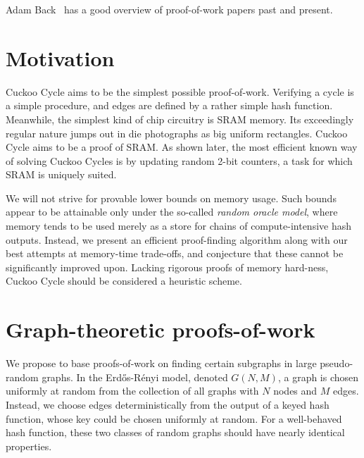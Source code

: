 \documentclass[11pt, oneside]{article}
\begin{document}
Adam Back~\cite{back2014} has a good overview of proof-of-work papers past and present.

\section{Motivation}
Cuckoo Cycle aims to be the simplest possible proof-of-work.
Verifying a cycle is a simple procedure, and edges are defined by a rather simple hash function.
Meanwhile, the simplest kind of chip circuitry is SRAM memory. Its exceedingly regular nature jumps out in
die photographs as big uniform rectangles. Cuckoo Cycle aims to be a proof of SRAM.
As shown later, the most efficient known way of solving Cuckoo Cycles is by updating
random 2-bit counters, a task for which SRAM is uniquely suited.

We will not strive for provable lower bounds on memory usage. Such bounds appear to be
attainable only under the so-called {\em random oracle model}, where memory tends to be used
merely as a store for chains of compute-intensive hash outputs.
Instead, we present an efficient proof-finding algorithm
along with our best attempts at memory-time trade-offs,
and conjecture that these cannot be significantly improved upon.
Lacking rigorous proofs of memory hard-ness, Cuckoo Cycle should be considered a heuristic scheme.

\section{Graph-theoretic proofs-of-work}
We propose to base proofs-of-work on finding certain subgraphs in large pseudo-random graphs.
In the Erd\H{o}s-R\'{e}nyi model, denoted $G(N,M)$, a graph is chosen uniformly at random
from the collection of all graphs with $N$ nodes and $M$ edges. Instead, we choose edges
deterministically from the output of a keyed hash function, whose key could be chosen
uniformly at random. For a well-behaved hash function, these two classes of random graphs
should have nearly identical properties.
\end{document}

